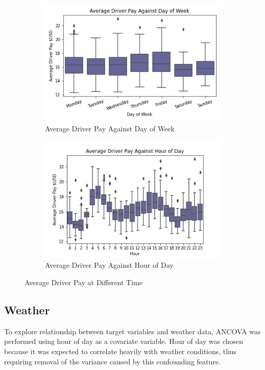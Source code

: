 \documentclass[11pt]{article}
\begin{document}
\begin{figure}[h]
\centering
\begin{subfigure}{.5\textwidth}
  \centering
  \includegraphics[width=0.9\linewidth]{plots/pay_v_day.png}
  \caption{Average Driver Pay Against Day of Week}
  \label{fig:sub1}
\end{subfigure}%
\begin{subfigure}{.5\textwidth}
  \centering
  \includegraphics[width=0.9\linewidth]{plots/pay_v_hour.png}
  \caption{Average Driver Pay Against Hour of Day}
  \label{fig:sub2}
\end{subfigure}
\caption{Average Driver Pay at Different Time}
\label{fig:test}
\end{figure}

\subsection{Weather}

To explore relationship between target variables and weather data, ANCOVA was performed using hour of day as a covariate variable. Hour of day was chosen because it was expected to correlate heavily with weather conditions, thus requiring removal of the variance caused by this confounding feature.
 
\end{document}
